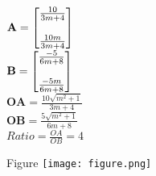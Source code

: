 \documentclass{beamer}
\begin{document}
\begin{frame}
\frametitle{}
$\textbf A = \begin{bmatrix} \frac{10}{3m+4} \\ \\ \frac{10m}{3m+4} \end{bmatrix}$\\
$\textbf B = \begin{bmatrix} \frac{-5}{6m+8} \\ \\ \frac{-5m}{6m+8} \end{bmatrix}$\\
$\textbf{OA} = \frac{10\sqrt{m^2+1}}{3m+4}$\\
$\textbf{OB} = \frac{5\sqrt{m^2+1}}{6m+8}$\\
$Ratio=\frac{OA}{OB}=4$
\end{frame}

\begin{frame}{Figure}
\centering
\texttt{[image: figure.png]}
\end{frame}
\end{document}
